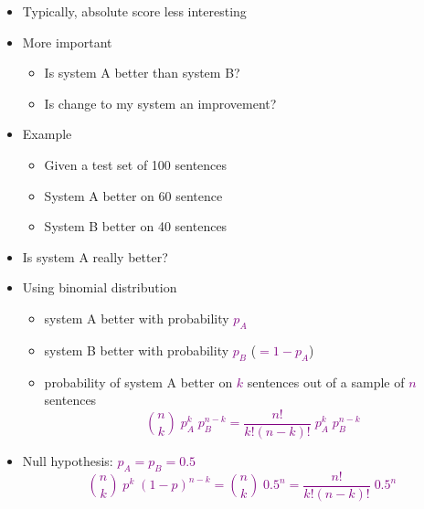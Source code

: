 \documentclass[landscape]{slides}
\newcommand{\maths}[1]{\textcolor{purple}{#1}}
\begin{document}

\vspace{10mm}
\begin{itemize}
\item Typically, absolute score less interesting
\item More important
\begin{itemize}
\item Is system A better than system B?
\item Is change to my system an improvement?
\end{itemize}
\item Example
\begin{itemize}
\item Given a test set of 100 sentences
\item System A better on 60 sentence
\item System B better on 40 sentences
\end{itemize}
\item Is system A really better?
\end{itemize}


\vspace{10mm}
\begin{itemize}
\item Using binomial distribution
\begin{itemize}
\item system A better with probability \maths{$p_A$}
\item system B better with probability \maths{$p_B$} (\maths{$=1-p_A$})
\item probability of system A better on \maths{$k$} sentences out of a sample of \maths{$n$} sentences
\maths{\begin{equation*}
\binom{n}{k} \; p_A^k \; p_B^{n-k} = \frac{n!}{k!(n-k)!} \; p_A^k \; p_B^{n-k}
\end{equation*}}
\end{itemize}
\item Null hypothesis: \maths{$p_A = p_B = 0.5$}
\maths{\begin{equation*}
\binom{n}{k} \; p^k \; (1-p)^{n-k} = \binom{n}{k} \; 0.5^n = \frac{n!}{k!(n-k)!} \; 0.5^n
\end{equation*}}
\end{itemize}
\end{document}
